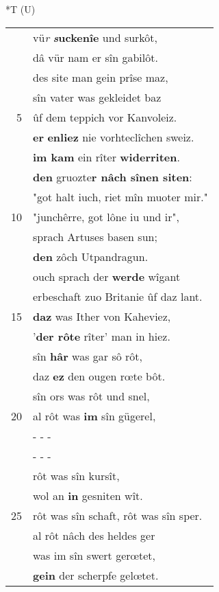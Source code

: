 \documentclass[8pt,a4paper,notitlepage]{article}
\begin{document}
\begin{table}[ht]
\begin{minipage}[t]{0.5\linewidth}
\end{minipage}
\hspace{0.5cm}
\begin{minipage}[t]{0.5\linewidth}
\small
\begin{center}*T (U)
\end{center}
\begin{tabular}{rl}
 & vü\textit{r} \textbf{\textit{s}uckenîe} und surkôt,\\ 
 & dâ vür nam er sîn gabilôt.\\ 
 & des site man gein prîse maz,\\ 
 & sîn vater was gekleidet baz\\ 
5 & ûf dem teppich vor Kanvoleiz.\\ 
 & \textbf{er} \textbf{en}\textbf{liez} nie vorhteclîchen sweiz.\\ 
 & \textbf{im kam} ein rîter \textbf{widerriten}.\\ 
 & \textbf{den} gruozte\textbf{r nâch sînen siten}:\\ 
 & "got halt iuch, riet mîn muoter mir."\\ 
10 & "junchêrre, got lône iu und ir",\\ 
 & sprach Artuses basen sun;\\ 
 & \textbf{den} zôch Utpandragun.\\ 
 & ouch sprach der \textbf{werde} wîgant\\ 
 & erbeschaft zuo Britanie ûf daz lant.\\ 
15 & \textbf{daz} was Ither von Kaheviez,\\ 
 & '\textbf{der rôte} rîter' man in hiez.\\ 
 & sîn \textbf{hâr} was gar sô rôt,\\ 
 & daz \textbf{ez} den ougen rœte bôt.\\ 
 & sîn ors was rôt und snel,\\ 
20 & al rôt was \textbf{im} sîn gügerel,\\ 
 & \multicolumn{1}{l}{ - - - }\\ 
 & \multicolumn{1}{l}{ - - - }\\ 
 & rôt was sîn kursît,\\ 
 & wol an \textbf{in} gesniten wît.\\ 
25 & rôt was sîn schaft, rôt was sîn sper.\\ 
 & al rôt nâch des heldes ger\\ 
 & was im sîn swert gerœtet,\\ 
 & \textbf{gein} der scherpfe gelœtet.\\ 

\end{tabular}
\end{minipage}
\end{table}
\end{document}
